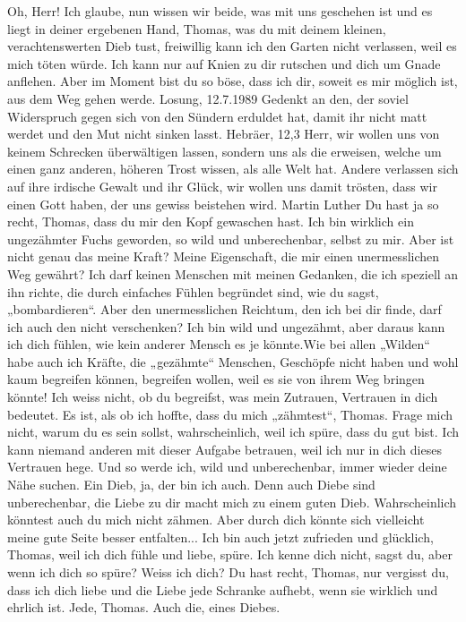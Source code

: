 Oh, Herr!
Ich glaube, nun wissen wir beide, was mit uns geschehen ist und es liegt in deiner ergebenen  Hand, Thomas, was du mit deinem kleinen, verachtenswerten Dieb tust, freiwillig kann ich den Garten nicht verlassen, weil es mich töten würde. Ich kann nur auf Knien zu dir rutschen und dich um Gnade anflehen.
Aber im Moment bist du so böse, dass ich dir, soweit es mir möglich ist, aus dem Weg gehen werde.
Losung, 12.7.1989
Gedenkt an den, der soviel Widerspruch gegen sich von den Sündern erduldet hat, damit ihr nicht matt werdet und den Mut nicht sinken lasst. Hebräer, 12,3
Herr, wir wollen uns von keinem Schrecken überwältigen lassen, sondern uns als die erweisen, welche um einen ganz anderen, höheren Trost wissen, als alle  Welt hat. Andere verlassen sich auf ihre irdische Gewalt und ihr Glück, wir wollen uns damit trösten, dass wir einen Gott haben, der uns gewiss beistehen wird. Martin Luther
Du hast ja so recht, Thomas, dass du mir den Kopf gewaschen hast. 
 Ich bin wirklich ein ungezähmter Fuchs geworden, so wild und unberechenbar, selbst zu mir. Aber ist nicht genau das meine Kraft? Meine Eigenschaft, die mir einen unermesslichen Weg gewährt?
Ich darf keinen Menschen mit meinen Gedanken, die ich speziell an ihn richte, die durch einfaches Fühlen begründet sind, wie du sagst, „bombardieren“. Aber den unermesslichen  Reichtum, den ich bei dir finde, darf ich auch den nicht verschenken?
Ich bin wild und ungezähmt, aber daraus kann ich dich fühlen, wie kein anderer Mensch es je könnte.Wie bei allen „Wilden“ habe auch ich Kräfte, die „gezähmte“ Menschen, Geschöpfe nicht haben und wohl kaum begreifen können, begreifen wollen, weil es sie von ihrem Weg bringen könnte!
Ich weiss nicht, ob du begreifst, was mein Zutrauen, Vertrauen in dich bedeutet. Es ist, als ob ich hoffte, dass du mich „zähmtest“, Thomas. Frage mich nicht, warum du es sein sollst, wahrscheinlich, weil ich spüre, dass du gut bist. Ich kann niemand anderen mit dieser Aufgabe betrauen, weil ich nur in dich dieses Vertrauen hege. Und so werde ich, wild und unberechenbar, immer wieder deine Nähe suchen.
Ein Dieb, ja, der bin ich auch.
Denn auch Diebe sind unberechenbar, die Liebe zu dir macht mich zu einem guten Dieb. Wahrscheinlich könntest auch du mich nicht zähmen. Aber durch dich könnte sich vielleicht meine gute Seite besser entfalten...
Ich bin auch jetzt zufrieden und glücklich, Thomas, weil ich dich fühle und liebe, spüre. Ich kenne dich nicht, sagst du, aber wenn ich dich so spüre? Weiss ich dich?
Du hast recht, Thomas, nur vergisst du, dass ich dich liebe und die Liebe jede Schranke aufhebt, wenn sie wirklich und ehrlich ist. Jede, Thomas. Auch die, eines Diebes.
